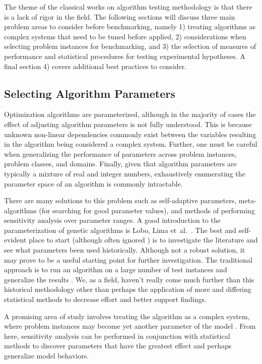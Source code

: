 The theme of the classical works on algorithm testing methodology is that there is a lack of rigor in the field. The following sections will discuss three main problem areas to consider before benchmarking, namely 1) treating algorithms as complex systems that need to be tuned before applied, 2) considerations when selecting problem instances for benchmarking, and 3) the selection of measures of performance and statistical procedures for testing experimental hypotheses. A final section 4) covers additional best practices to consider.


% 
% 
\subsection{Selecting Algorithm Parameters}
Optimization algorithms are parameterized, although in the majority of cases the effect of adjusting algorithm parameters is not fully understood. This is because unknown non-linear dependencies commonly exist between the variables resulting in the algorithm being considered a complex system. Further, one must be careful when generalizing the performance of parameters across problem instances, problem classes, and domains. Finally, given that algorithm parameters are typically a mixture of real and integer numbers, exhaustively enumerating the parameter space of an algorithm is commonly intractable.

There are many solutions to this problem such as self-adaptive parameters, meta-algorithms (for searching for good parameter values), and methods of performing sensitivity analysis over parameter ranges. A good introduction to the parameterization of genetic algorithms is Lobo, Lima et~al.\ \cite{Lobo2007}. The best and self-evident place to start (although often ignored \cite{Eiben2002}) is to investigate the literature and see what parameters been used historically. Although not a robust solution, it may prove to be a useful starting point for further investigation. The traditional approach is to run an algorithm on a large number of test instances and generalize the results \cite{Schaffer1989}. We, as a field, haven't really come much further than this historical methodology other than perhaps the application of more and differing statistical methods to decrease effort and better support findings.

A promising area of study involves treating the algorithm as a complex system, where problem instances may become yet another parameter of the model \cite{Saltelli2002, Campolongo2000}. From here, sensitivity analysis can be performed in conjunction with statistical methods to discover parameters that have the greatest effect \cite{Chan1997} and perhaps generalize model behaviors.

